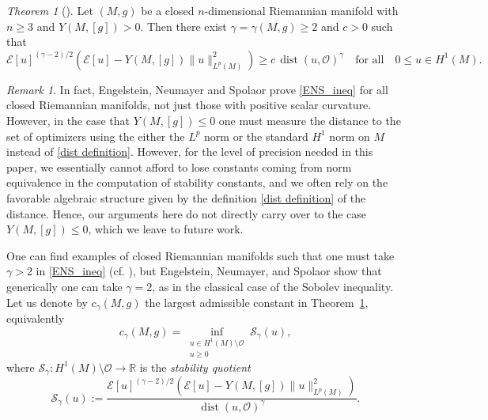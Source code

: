 \documentclass[reqno,11pt]{amsart}
\numberwithin{equation}{section}
\theoremstyle{definition}
\theoremstyle{remark}
\newtheorem{remark}[theorem]{Remark}
\newtheorem{theoremletter}{Theorem}
\DeclareMathOperator{\dist}{dist}
\newcommand{\R}{\mathbb{R}}
\begin{document}
\begin{theoremletter}[{\cite{ENS}}]
\label{theorem ENS}
Let $(M,g)$ be a closed $n$-dimensional Riemannian manifold with $n \geqslant 3$ and $Y(M,[g]) > 0$. Then
there exist $\gamma = \gamma(M,g) \geqslant 2$ and $c > 0$ such that
\begin{equation} \label{ENS_ineq} 
\mathcal{E}[u]^{(\gamma-2)/2} \left( \mathcal{E}[u] - Y(M,[g]) \|u\|_{L^p(M)}^2 \right) 
\geqslant c\, \dist(u,\mathscr{O})^\gamma
\quad \text{for all} \quad 0 \leqslant u \in H^1(M). 
\end{equation} 
\end{theoremletter}

\begin{remark}
    In fact, Engelstein, Neumayer and Spolaor prove \eqref{ENS_ineq} for all closed Riemannian 
    manifolds, not just those with positive scalar curvature. However, in the case 
    that $Y(M,[g]) \leqslant 0$ one must measure the distance to the set of 
    optimizers using the either the $L^p$ norm or the standard $H^1$ norm on $M$ instead of \eqref{dist definition}.  
    However, for the level of precision needed 
    in this paper, we essentially cannot afford to lose constants coming from norm equivalence 
    in the computation of stability constants, and we often rely on the favorable algebraic 
    structure given by the definition \eqref{dist definition} of the distance. Hence, our arguments here do 
    not directly carry over to the case $Y(M, [g]) \leqslant 0$, which we leave to future work. 
\end{remark}

One can find examples of closed Riemannian manifolds such that one must take 
$\gamma>2$ in \eqref{ENS_ineq} (cf. \cite{F}), but Engelstein, Neumayer, and Spolaor show that generically 
one can take $\gamma=2$, as in the classical case of the Sobolev inequality. 
Let us denote by $c_{\gamma}(M,g)$ the largest admissible constant in 
Theorem~\ref{theorem ENS}, equivalently
\begin{equation}\label{eq:ENS-def}
c_{\gamma}(M,g) = \inf_{\substack{u \in H^1(M) \setminus \mathscr{O}\\ u\geqslant 0}} \mathcal{S}_\gamma(u),
\end{equation}
where $\mathcal{S}_\gamma: H^1(M) \setminus \mathscr{O} \to \R$ is the \emph{stability quotient}
\begin{equation} \label{defn_stability} 
\mathcal{S}_\gamma(u) := \frac{\mathcal{E}[u]^{(\gamma-2)/2} \left( \mathcal{E}[u] - Y(M,[g]) \|u\|_{L^p(M)}^2 \right)}{\dist(u,\mathscr{O})^\gamma}.
\end{equation} 
\end{document}
